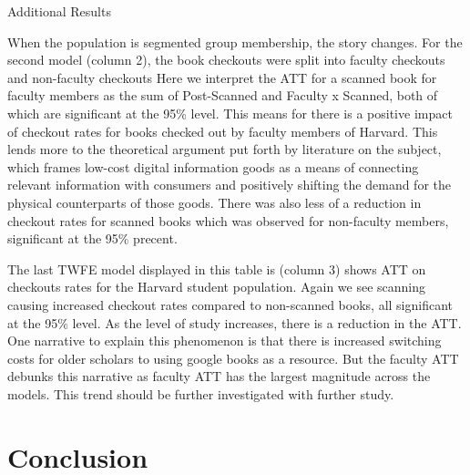 \documentclass{article}
\begin{document}
\begin{table}[htbp]
   \centering
   \caption{Additional Results}
  
   \label{tab:booktabs}
\end{table}

When the population is segmented group membership, the story changes. For the second model (column 2), the book checkouts were split into faculty checkouts and non-faculty checkouts  Here we interpret the ATT for a scanned book for faculty members as the sum of Post-Scanned and Faculty x Scanned, both of which are significant at the 95\% level. This means for there is a positive impact of checkout rates for books checked out by faculty members of Harvard. This lends more to the theoretical argument put forth by literature on the subject, which frames low-cost digital information goods as a means of connecting relevant information with consumers and positively shifting the demand for the physical counterparts of those goods. There was also less of a reduction in checkout rates for scanned books which was observed for non-faculty members, significant at the 95\% precent. 

The last TWFE model displayed in this table is (column 3) shows ATT on checkouts rates for the Harvard student population. Again we see scanning causing increased checkout rates compared to non-scanned books, all significant at the 95\% level. As the level of study increases, there is a reduction in the ATT. One narrative to explain this phenomenon is that there is increased switching costs for older scholars to using google books as a resource. But the faculty ATT debunks this narrative as faculty ATT has the largest magnitude across the models. This trend should be further investigated with further study.





\section{Conclusion}
\end{document}
